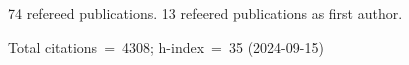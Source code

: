 74 refereed publications. 13 refeered publications as first author.

Total citations~=~4308; h-index~=~35 (2024-09-15)